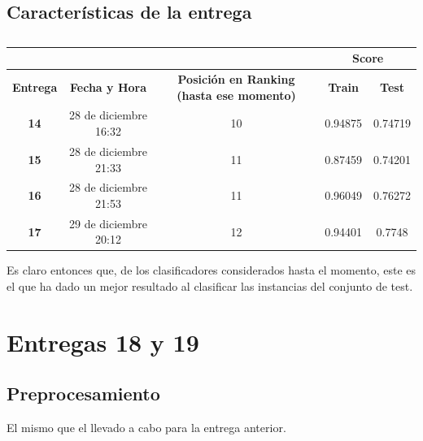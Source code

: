 \documentclass[a4paper,11pt]{article}
\begin{document}
 \subsection{Características de la entrega}
 \begin{table}[htbp]
 	\caption{}\begin{center}
 	\begin{tabular}{|c|c|c|c|c|}
 		\hline
 		\multicolumn{1}{|l|}{\textbf{}} & \textbf{} & \textbf{} & \multicolumn{ 2}{c|}{\textbf{Score}} \\ \hline
 		\textbf{Entrega} & \textbf{Fecha y Hora} & \textbf{Posición en Ranking (hasta ese momento)} & \textbf{Train} & \textbf{Test} \\ \hline
 		\textbf{14} & 28 de diciembre 16:32  & 10 & 0.94875 & 0.74719 \\ \hline
 		\textbf{15} & 28 de diciembre 21:33  & 11 & 0.87459 & 0.74201 \\ \hline
 		\textbf{16} & 28 de diciembre 21:53 & 11 & 0.96049 & 0.76272 \\ \hline
 		\textbf{17} & 29 de diciembre 20:12 & 12 & 0.94401 & 0.7748 \\ \hline
 	\end{tabular}\end{center}
 	\label{}
 \end{table}
 
 Es claro entonces que, de los clasificadores considerados hasta el momento, este es el que ha dado un mejor resultado al clasificar las instancias del conjunto de test.
 
 \section{Entregas 18 y 19}
 \subsection{Preprocesamiento}
 El mismo que el llevado a cabo para la entrega anterior.
\end{document}
